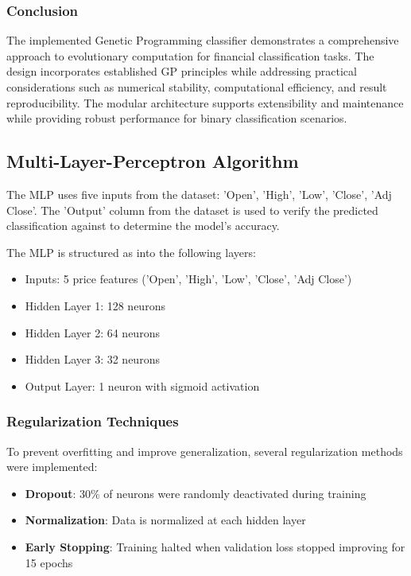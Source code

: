 \documentclass[a4paper,12pt]{article}
\begin{document}
\subsubsection{Conclusion}
The implemented Genetic Programming classifier demonstrates a comprehensive approach to evolutionary computation for financial classification tasks. The design incorporates established GP principles while addressing practical considerations such as numerical stability, computational efficiency, and result reproducibility. The modular architecture supports extensibility and maintenance while providing robust performance for binary classification scenarios.

\subsection{Multi-Layer-Perceptron Algorithm}
The MLP uses five inputs from the dataset: 'Open', 'High', 'Low', 'Close', 'Adj Close'. The 'Output' column from the dataset is used to verify the predicted classification against to determine the model's accuracy.

The MLP is structured as into the following layers:
\begin{itemize}
\item Inputs: 5 price features ('Open', 'High', 'Low', 'Close', 'Adj Close')
\item Hidden Layer 1: 128 neurons
\item Hidden Layer 2: 64 neurons 
\item Hidden Layer 3: 32 neurons
\item Output Layer: 1 neuron with sigmoid activation
\end{itemize}

\subsubsection{Regularization Techniques}
To prevent overfitting and improve generalization, several regularization methods were implemented:
\begin{itemize}
\item \textbf{Dropout}: 30\% of neurons were randomly deactivated during training
\item \textbf{Normalization}: Data is normalized at each hidden layer
\item \textbf{Early Stopping}: Training halted when validation loss stopped improving for 15 epochs
\end{itemize}
\end{document}
